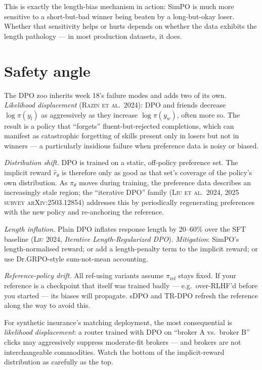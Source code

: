 \documentclass[11pt,oneside]{scrbook}
\begin{document}
This is exactly the length-bias mechanism in action: SimPO is much
more sensitive to a short-but-bad winner being beaten by a
long-but-okay loser. Whether that sensitivity helps or hurts
depends on whether the data exhibits the length pathology --- in
most production datasets, it does.

\chapter{Safety angle}

\begin{safetyangle}
The DPO zoo inherits week 18's failure modes and adds two of its
own. \emph{Likelihood displacement} (\textsc{Razin et al.\ 2024}):
DPO and friends decrease $\log\pi(y_l)$ as aggressively as they
increase $\log\pi(y_w)$, often more so. The result is a policy that
``forgets'' fluent-but-rejected completions, which can manifest as
catastrophic forgetting of skills present only in losers but not in
winners --- a particularly insidious failure when preference data is
noisy or biased.

\emph{Distribution shift.} DPO is trained on a static, off-policy
preference set. The implicit reward $\hat r_\theta$ is therefore
only as good as that set's coverage of the policy's own
distribution. As $\pi_\theta$ moves during training, the
preference data describes an increasingly stale region; the
``iterative DPO'' family (\textsc{Liu et al.\ 2024},
\textsc{2025 survey arXiv:2503.12854}) addresses this by
periodically regenerating preferences with the new policy and
re-anchoring the reference.

\emph{Length inflation.} Plain DPO inflates response length by 20--60\%
over the SFT baseline (\textsc{Liu 2024}, \emph{Iterative
Length-Regularized DPO}). \emph{Mitigation}: SimPO's
length-normalised reward; or add a length-penalty term to the
implicit reward; or use Dr.GRPO-style sum-not-mean accounting.

\emph{Reference-policy drift.} All ref-using variants assume
$\pi_{\text{ref}}$ stays fixed. If your reference is a checkpoint that
itself was trained badly --- e.g.\ over-RLHF'd before you started ---
its biases will propagate. sDPO and TR-DPO refresh the reference
along the way to avoid this.

For synthetic insurance's matching deployment, the most consequential is
\emph{likelihood displacement}: a router trained with DPO on
``broker A vs.\ broker B'' clicks may aggressively suppress
moderate-fit brokers --- and brokers are not interchangeable
commodities. Watch the bottom of the implicit-reward distribution
as carefully as the top.
\end{safetyangle}
\end{document}

